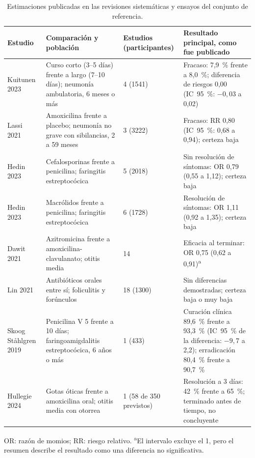 \documentclass[10pt,a4paper]{article}
\begin{document}
\begin{table}[htbp]
\centering
\caption{Estimaciones publicadas en las revisiones sistemáticas y ensayos del conjunto de referencia.}
\scriptsize
\begin{tabularx}{\textwidth}{@{}lXlX@{}}
\toprule
Estudio & Comparación y población & Estudios (participantes) & Resultado principal, como fue publicado \\
\midrule
Kuitunen 2023~\citep{kuitunen2023} & Curso corto (3--5 días) frente a largo (7--10 días); neumonía ambulatoria, 6 meses o más & 4 (\num{1541}) & Fracaso: 7,9~\% frente a 8,0~\%; diferencia de riesgos 0,00 (IC~95~\%: $-0{,}03$ a 0,02) \\
Lassi 2021~\citep{lassi2021} & Amoxicilina frente a placebo; neumonía no grave con sibilancias, 2 a 59 meses & 3 (\num{3222}) & Fracaso: RR 0,80 (IC~95~\%: 0,68 a 0,94); certeza baja \\
Hedin 2023~\citep{hedin2023} & Cefalosporinas frente a penicilina; faringitis estreptocócica & 5 (\num{2018}) & Sin resolución de síntomas: OR 0,79 (0,55 a 1,12); certeza baja \\
Hedin 2023~\citep{hedin2023} & Macrólidos frente a penicilina; faringitis estreptocócica & 6 (\num{1728}) & Resolución de síntomas: OR 1,11 (0,92 a 1,35); certeza baja \\
Dawit 2021~\citep{dawit2021} & Azitromicina frente a amoxicilina-clavulanato; otitis media & 14 & Eficacia al terminar: OR 0,75 (0,62 a 0,91)\textsuperscript{a} \\
Lin 2021~\citep{lin2021} & Antibióticos orales entre sí; foliculitis y forúnculos & 18 (\num{1300}) & Sin diferencias demostradas; certeza baja o muy baja \\
Skoog Ståhlgren 2019~\citep{skoog2019} & Penicilina V 5 frente a 10 días; faringoamigdalitis estreptocócica, 6 años o más & 1 (433) & Curación clínica 89,6~\% frente a 93,3~\% (IC~95~\% de la diferencia: $-9{,}7$ a 2,2); erradicación 80,4~\% frente a 90,7~\% \\
Hullegie 2024~\citep{hullegie2024} & Gotas óticas frente a amoxicilina oral; otitis media con otorrea & 1 (58 de 350 previstos) & Resolución a 3 días: 42~\% frente a 65~\%; terminado antes de tiempo, no concluyente \\
\bottomrule
\end{tabularx}

\vspace{2pt}
\begin{minipage}{0.95\textwidth}\footnotesize
OR: razón de momios; RR: riesgo relativo. \textsuperscript{a}El intervalo excluye el 1, pero el resumen describe el resultado como una diferencia no significativa.
\end{minipage}
\end{table}
\end{document}
